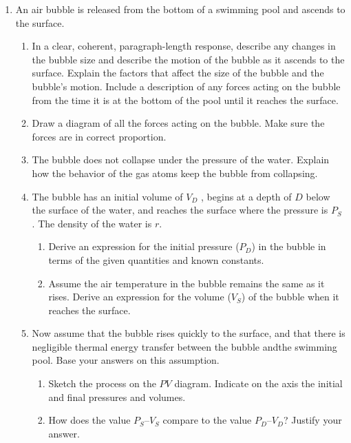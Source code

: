 \documentclass{../../oss-apphys}
\begin{document}
\begin{enumerate}[leftmargin=15pt]

\item An air bubble is released from the bottom of a swimming pool and ascends
  to the surface.
  \begin{enumerate}[leftmargin=18pt]
  \item In a clear, coherent, paragraph-length response, describe any
    changes in the bubble size and describe the motion of the bubble
    as it ascends to the surface. Explain the factors that affect the size
    of the bubble and the bubble's motion. Include a description of
    any forces acting on the bubble from the time it is at the bottom of
    the pool until it reaches the surface.
    \vspace{1.75in}
    
  \item Draw a diagram of all the forces acting on the bubble. Make sure
    the forces are in correct proportion.
    \vspace{1.75in}

  \item The bubble does not collapse under the pressure of the water.
    Explain how the behavior of the gas atoms keep the bubble from
    collapsing.
    \newpage
    
  \item The bubble has an initial volume of $V_D$ , begins at a depth of $D$
    below the surface of the water, and reaches the surface where the
    pressure is $P_S$ . The density of the water is $r$.
    \begin{enumerate}
    \item  Derive an expression for the initial pressure ($P_D$) in the bubble
      in terms of the given quantities and known constants.
    \item Assume the air temperature in the bubble remains the same as
      it rises. Derive an expression for the volume ($V_S$) of the bubble
      when it reaches the surface.
    \end{enumerate}
    \vspace{2in}
    
  \item Now assume that the bubble rises quickly to the surface, and that
    there is negligible thermal energy transfer between the bubble andthe
    swimming pool. Base your answers on this assumption.
    \begin{enumerate}
    \item Sketch the process on the $PV$ diagram. Indicate on the axis the
      initial and final pressures and volumes.
    \item How does the value $P_S$--$V_S$ compare to the value $P_D$--$V_D$?
      Justify your answer.
    \end{enumerate}
    \vspace{1.75in}
    

\end{enumerate}
\end{enumerate}
\end{document}
